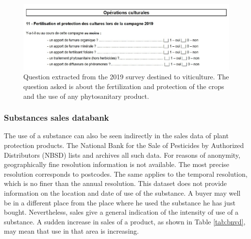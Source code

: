 \begin{figure}[ht]
    \centering
    \includegraphics[scale=0.75]{figs/Chap3/PK1.pdf}
    \caption{Question extracted from the 2019 survey destined to viticulture. The question asked is about the fertilization and protection of the crops and the use of any phytosanitary product.}
    \label{fig:PK1}
\end{figure}

\subsubsection{Substances sales databank}

The use of a substance can also be seen indirectly in the sales data of plant protection products. The National Bank for the Sale of Pesticides by Authorized Distributors (NBSD) \cite{BNVD} lists and archives all such data. For reasons of anonymity, geographically fine resolution information is not available. The most precise resolution corresponds to postcodes. The same applies to the temporal resolution, which is no finer than the annual resolution. This dataset does not provide information on the location and date of use of the substance. A buyer may well be in a different place from the place where he used the substance he has just bought. Nevertheless, sales give a general indication of the intensity of use of a substance. A sudden increase in sales of a product, as shown in Table \ref{tab:bnvd}, may mean that use in that area is increasing.

